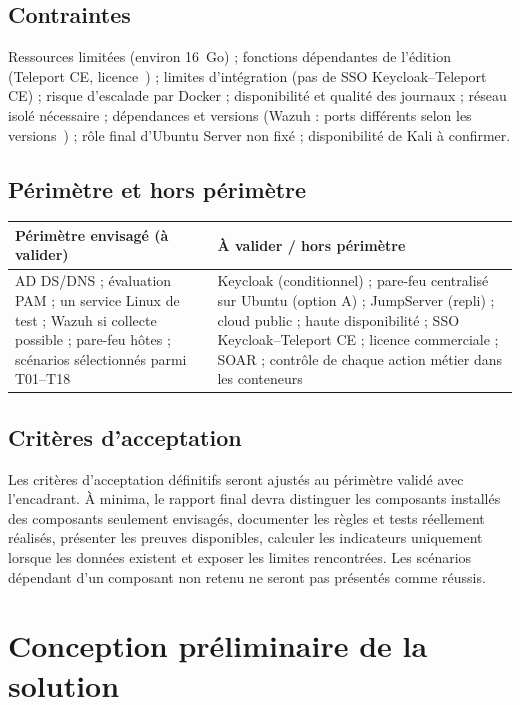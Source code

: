 \documentclass[11pt,a4paper]{report}
\begin{document}
\section{Contraintes}
Ressources limitées (environ 16~Go) ; fonctions dépendantes de l'édition (Teleport CE, licence~\cite{tp-licence}) ; limites d'intégration (pas de SSO Keycloak--Teleport CE) ; risque d'escalade par Docker ; disponibilité et qualité des journaux ; réseau isolé nécessaire ; dépendances et versions (Wazuh : ports différents selon les versions~\cite{wazuh-arch}) ; rôle final d'Ubuntu Server non fixé ; disponibilité de Kali à confirmer.

\section{Périmètre et hors périmètre}\label{sec:perim}
\begin{tabularx}{\textwidth}{@{}XX@{}}
\toprule\textbf{Périmètre envisagé (à valider)} & \textbf{À valider / hors périmètre}\\ \midrule
AD DS/DNS ; évaluation PAM ; un service Linux de test ; Wazuh si collecte possible ; pare-feu hôtes ; scénarios sélectionnés parmi T01--T18 & Keycloak (conditionnel) ; pare-feu centralisé sur Ubuntu (option A) ; JumpServer (repli) ; cloud public ; haute disponibilité ; SSO Keycloak--Teleport CE ; licence commerciale ; SOAR ; contrôle de chaque action métier dans les conteneurs\\
\bottomrule
\end{tabularx}

\section{Critères d'acceptation}
Les critères d'acceptation définitifs seront ajustés au périmètre validé avec l'encadrant. À minima, le rapport final devra distinguer les composants installés des composants seulement envisagés, documenter les règles et tests réellement réalisés, présenter les preuves disponibles, calculer les indicateurs uniquement lorsque les données existent et exposer les limites rencontrées. Les scénarios dépendant d'un composant non retenu ne seront pas présentés comme réussis.

\chapter{Conception préliminaire de la solution}
\end{document}
